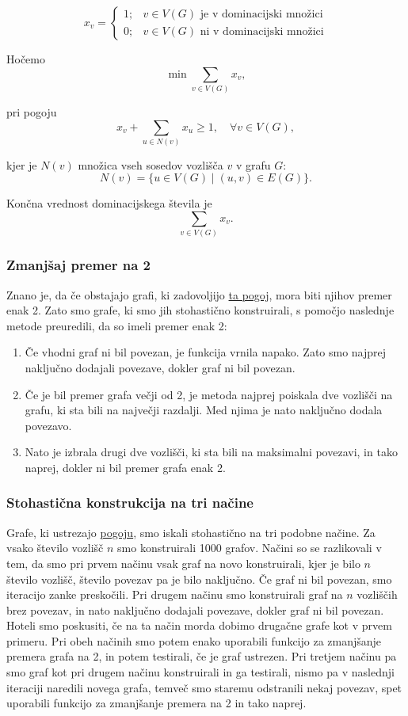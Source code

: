 \documentclass[a4paper,12pt]{article}
\theoremstyle{definition}
\begin{document}
$$
x_v =
\begin{cases} 
      1; & v \in V(G) \text{ je v dominacijski množici} \\
      0; & v \in V(G) \text{ ni v dominacijski množici} 
\end{cases}
$$

Hočemo
$$
\min \sum_{v\in V(G)} x_v,
$$

pri pogoju
$$
x_v + \sum_{u \in N(v)} x_u \geq 1, \quad \forall v \in V(G),
$$

kjer je $N(v)$ množica vseh sosedov vozlišča $v$ v grafu $G$:  
$$
N(v) = \{ u \in V(G) \mid (u,v) \in E(G) \}.
$$

Končna vrednost dominacijskega števila je
$$
\sum_{v\in V(G)} x_v.
$$

\subsubsection{Zmanjšaj premer na 2}
\noindent Znano je, da če obstajajo grafi, ki zadovoljijo \hyperref[pogoj]{ta pogoj}, mora biti njihov premer enak 2. Zato smo grafe, ki smo jih stohastično konstruirali, s pomočjo naslednje metode preuredili, da so imeli premer enak 2:
\begin{enumerate}
    \item Če vhodni graf ni bil povezan, je funkcija vrnila napako. Zato smo najprej naključno dodajali povezave, dokler graf ni bil povezan.
    \item Če je bil premer grafa večji od 2, je metoda najprej poiskala dve vozlišči na grafu, ki sta bili na največji razdalji. Med  njima je nato naključno dodala povezavo.
    \item Nato je izbrala drugi dve vozlišči, ki sta bili na maksimalni povezavi, in tako naprej, dokler ni bil premer grafa enak 2.
\end{enumerate}

\subsubsection{Stohastična konstrukcija na tri načine}\label{stohasticna}
\noindent Grafe, ki ustrezajo \hyperref[pogoj]{pogoju}, smo iskali stohastično na tri podobne načine. Za vsako število vozlišč $n$ smo konstruirali 1000 grafov. Načini so se razlikovali v tem, da smo pri prvem načinu vsak graf na novo konstruirali, kjer je bilo $n$ število vozlišč, število povezav pa je bilo naključno. Če graf ni bil povezan, smo iteracijo zanke preskočili. Pri drugem načinu smo konstruirali graf na $n$ vozliščih brez povezav, in nato naključno dodajali povezave, dokler graf ni bil povezan. Hoteli smo poskusiti, če na ta način morda dobimo drugačne grafe kot v prvem primeru. Pri obeh načinih smo potem enako uporabili funkcijo za zmanjšanje premera grafa na 2, in potem testirali, če je graf ustrezen. Pri tretjem načinu pa smo graf kot pri drugem načinu konstruirali in ga testirali, nismo pa v naslednji iteraciji naredili novega grafa, temveč smo staremu odstranili nekaj povezav, spet uporabili funkcijo za zmanjšanje premera na 2 in tako naprej.
\end{document}
